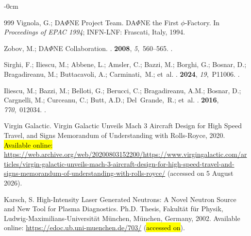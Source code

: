 \documentclass[particles,article,accept,pdftex,moreauthors]{Definitions/mdpi}
\begin{document}
\begin{adjustwidth}{-\extralength}{0cm}
\begin{thebibliography}{999}
Vignola, G.; {DA$\Phi$NE Project Team}.
\newblock DA$\Phi$NE the First $\phi$-Factory. In {\em Proceedings of EPAC
  1994}; INFN-LNF: Frascati, Italy,  1994.

Zobov, M.; {DA$\Phi$NE Collaboration}.
.
 {\bf 2008}, {\em 5},~560--565.
.

Sirghi, F.; Iliescu, M.;  Abbene, L.; Amsler, C.; Bazzi, M.; Borghi, G.; Bosnar, D.; Bragadireanu, M.; Buttacavoli, A.; Carminati,~M.; et~al.
.
 {\bf 2024}, {\em 19},~P11006.
.

Iliescu, M.; Bazzi, M.;  Belloti, G.; Berucci, C.; Bragadireanu, A.M.; Bosnar, D.; Cargnelli, M.; Curceanu, C.; Butt, A.D.; Del~Grande,~R.; et~al.
.
 {\bf 2016}, {\em 770},~012034.
.

{Virgin Galactic}.
\newblock Virgin Galactic Unveils Mach 3 Aircraft Design for High Speed Travel,
  and Signs Memorandum of Understanding with Rolls-Royce,  2020.
\newblock 
\hl{Available online: } %
 \url{https://web.archive.org/web/20200803152200/https://www.virgingalactic.com/articles/virgin-galactic-unveils-mach-3-aircraft-design-for-high-speed-travel-and-signs-memorandum-of-understanding-with-rolls-royce/}
(accessed on 5 August 2026).

Karsch, S.
\newblock High-Intensity Laser Generated Neutrons: A Novel Neutron Source and
  New Tool for Plasma Diagnostics.
\newblock Ph.D. Thesis, Fakult\"at f\"ur Physik, Ludwig-Maximilians-Universit\"at
  M\"unchen, M\"unchen,  Germany, 2002.
\newblock Available online:  \url{https://edoc.ub.uni-muenchen.de/703/} (\hl{accessed on}).

\end{thebibliography}

\PublishersNote{}
\end{adjustwidth}
\end{document}

